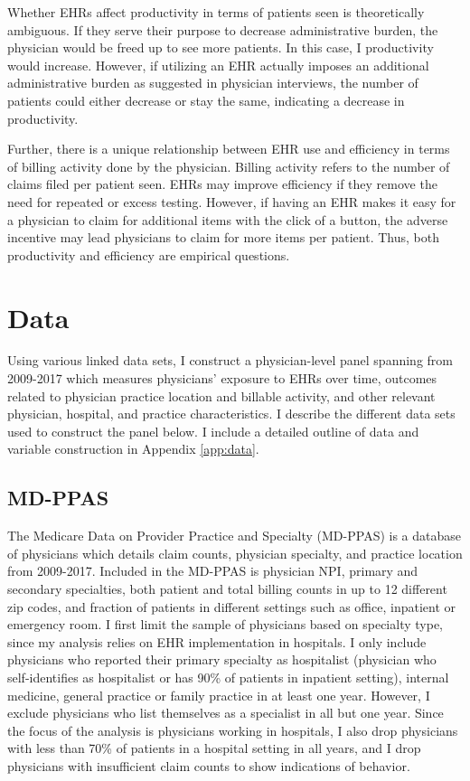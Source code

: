\documentclass[12pt]{article}
\begin{document}
Whether EHRs affect productivity in terms of patients seen is theoretically ambiguous. If they serve their purpose to decrease administrative burden, the physician would be freed up to see more patients. In this case, I productivity would increase. However, if utilizing an EHR actually imposes an additional administrative burden as suggested in physician interviews, the number of patients could either decrease or stay the same, indicating a decrease in productivity.  

Further, there is a unique relationship between EHR use and efficiency in terms of billing activity done by the physician. Billing activity refers to the number of claims filed per patient seen. EHRs may improve efficiency if they remove the need for repeated or excess testing. However, if having an EHR makes it easy for a physician to claim for additional items with the click of a button, the adverse incentive may lead physicians to claim for more items per patient. Thus, both productivity and efficiency are empirical questions. 




\section{Data}\label{sec:data}

Using various linked data sets, I construct a physician-level panel spanning from 2009-2017 which measures physicians' exposure to EHRs over time, outcomes related to physician practice location and billable activity, and other relevant physician, hospital, and practice characteristics. I describe the different data sets used to construct the panel below. I include a detailed outline of data and variable construction in Appendix \ref{app:data}.

\subsection{MD-PPAS}

The Medicare Data on Provider Practice and Specialty (MD-PPAS) is a database of physicians which details claim counts, physician specialty, and practice location from 2009-2017. Included in the MD-PPAS is physician NPI, primary and secondary specialties, both patient and total billing counts in up to 12 different zip codes, and fraction of patients in different settings such as office, inpatient or emergency room. I first limit the sample of physicians based on specialty type, since my analysis relies on EHR implementation in hospitals. I only include physicians who reported their primary specialty as hospitalist (physician who self-identifies as hospitalist or has 90\% of patients in inpatient setting), internal medicine, general practice or family practice in at least one year. However, I exclude physicians who list themselves as a specialist in all but one year. Since the focus of the analysis is physicians working in hospitals, I also drop physicians with less than 70\% of patients in a hospital setting in all years, and I drop physicians with insufficient claim counts to show indications of behavior.
\end{document}
